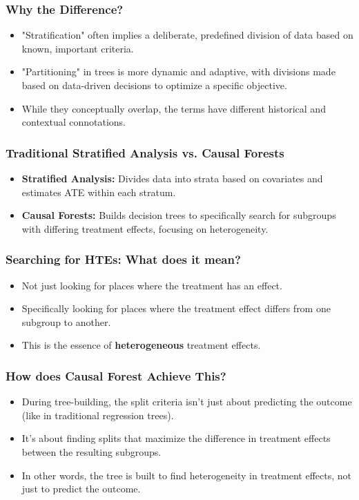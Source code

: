 \documentclass{beamer}
\begin{document}
\begin{frame}
\frametitle{Why the Difference?}
\begin{itemize}
    \item "Stratification" often implies a deliberate, predefined division of data based on known, important criteria.
    \item "Partitioning" in trees is more dynamic and adaptive, with divisions made based on data-driven decisions to optimize a specific objective.
    \item While they conceptually overlap, the terms have different historical and contextual connotations.
\end{itemize}
\end{frame}




\begin{frame}
\frametitle{Traditional Stratified Analysis vs. Causal Forests}
\begin{itemize}
\item \textbf{Stratified Analysis:} Divides data into strata based on covariates and estimates ATE within each stratum. 
\item \textbf{Causal Forests:} Builds decision trees to specifically search for subgroups with differing treatment effects, focusing on heterogeneity.
\end{itemize}
\end{frame}

\begin{frame}
\frametitle{Searching for HTEs: What does it mean?}
\begin{itemize}
\item Not just looking for places where the treatment has an effect.
\item Specifically looking for places where the treatment effect differs from one subgroup to another.
\item This is the essence of \textbf{heterogeneous} treatment effects.
\end{itemize}
\end{frame}

\begin{frame}
\frametitle{How does Causal Forest Achieve This?}
\begin{itemize}
\item During tree-building, the split criteria isn't just about predicting the outcome (like in traditional regression trees).
\item It's about finding splits that maximize the difference in treatment effects between the resulting subgroups.
\item In other words, the tree is built to find heterogeneity in treatment effects, not just to predict the outcome.
\end{itemize}
\end{frame}
\end{document}
